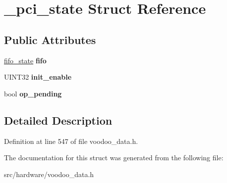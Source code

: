 \hypertarget{struct__pci__state}{\section{\-\_\-pci\-\_\-state Struct Reference}
\label{struct__pci__state}
}
\subsection*{Public Attributes}
\begin{DoxyCompactItemize}
\item 
\hypertarget{struct__pci__state_ab7424427a466f808c1740b6a25206cac}{\hyperlink{struct__fifo__state}{fifo\-\_\-state} {\bfseries fifo}}\label{struct__pci__state_ab7424427a466f808c1740b6a25206cac}

\item 
\hypertarget{struct__pci__state_a2dd58b63b4d56512132776f3a1e2a790}{U\-I\-N\-T32 {\bfseries init\-\_\-enable}}\label{struct__pci__state_a2dd58b63b4d56512132776f3a1e2a790}

\item 
\hypertarget{struct__pci__state_a8127a09374816a0e7266b527a1fa0d2e}{bool {\bfseries op\-\_\-pending}}\label{struct__pci__state_a8127a09374816a0e7266b527a1fa0d2e}

\end{DoxyCompactItemize}


\subsection{Detailed Description}


Definition at line 547 of file voodoo\-\_\-data.\-h.



The documentation for this struct was generated from the following file\-:\begin{DoxyCompactItemize}
\item 
src/hardware/voodoo\-\_\-data.\-h\end{DoxyCompactItemize}
